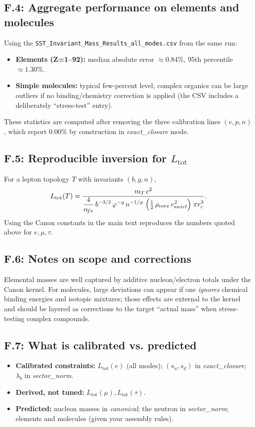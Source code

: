 \documentclass[11pt, preprint,titlepage]{revtex4-2}
\begin{document}
		\subsection*{F.4: Aggregate performance on elements and molecules}
		Using the \texttt{SST\_Invariant\_Mass\_Results\_all\_modes.csv} from the same run:
		\begin{itemize}
		\item \textbf{Elements (Z=1–92):} median absolute error \(\approx 0.84\%\), 95th percentile \(\approx 1.30\%\).
		\item \textbf{Simple molecules:} typical few-percent level; complex organics can be large outliers if no binding/chemistry correction is applied (the CSV includes a deliberately “stress-test” entry).
		\end{itemize}
		These statistics are computed after removing the three calibration lines \((e,p,n)\), which report \(0.00\%\) by construction in \textit{exact\_closure} mode.

		\subsection*{F.5: Reproducible inversion for \(L_{\text{tot}}\)}
		For a lepton topology \(T\) with invariants \((b,g,n)\),
		\[
		L_{\text{tot}}(T)
		= \frac{ m_T\,c^2 }{ \displaystyle \frac{4}{\alpha_{\!fs}}\,b^{-3/2}\,\varphi^{-g}\,n^{-1/\varphi}\;
		\Big(\tfrac12\,\rho_{\textrm core}\,v_{\textrm swirl}^{2}\Big)\;\pi r_c^{3} }.
		\]
		Using the Canon constants in the main text reproduces the numbers quoted above for \(e,\mu,\tau\).

		\subsection*{F.6: Notes on scope and corrections}
		Elemental masses are well captured by additive nucleon/electron totals under the Canon kernel. For molecules, large deviations can appear if one \emph{ignores} chemical binding energies and isotopic mixtures; those effects are external to the kernel and should be layered as corrections to the target “actual mass” when stress-testing complex compounds.

		\subsection*{F.7: What is calibrated vs. predicted}
		\begin{itemize}
		\item \textbf{Calibrated constraints:} \(L_{\text{tot}}(e)\) (all modes); \((s_u,s_d)\) in \textit{exact\_closure}; \(\lambda_b\) in \textit{sector\_norm}.
		\item \textbf{Derived, not tuned:} \(L_{\text{tot}}(\mu),L_{\text{tot}}(\tau)\).
		\item \textbf{Predicted:} nucleon masses in \textit{canonical}; the neutron in \textit{sector\_norm}; elements and molecules (given your assembly rules).
		\end{itemize}
\end{document}
